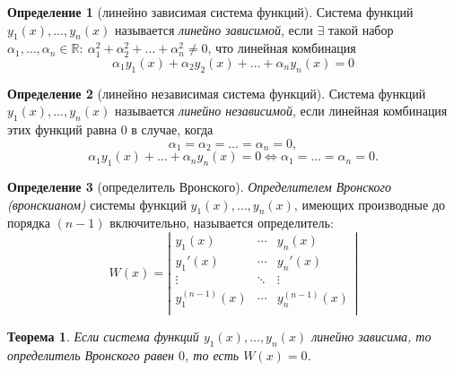 \documentclass[11pt,a4paper,oneside]{report}
\theoremstyle{definition}
\newtheorem{definition}{Определение}[section]
\theoremstyle{plain}
\newtheorem{theorem}{Теорема}[section]
\theoremstyle{remark}
\begin{document}
\begin{definition}[линейно зависимая система функций]
    Система функций $y_1(x), \ldots, y_n(x)$ называется \emph{линейно зависимой}, если $\exists$ такой набор $\alpha_1,\ldots,\alpha_n \in \mathbb{R}: \ \alpha_1^2 + \alpha_2^2 + \ldots + \alpha_n^2 \ne 0$, что линейная комбинация
    \begin{equation*}
        \alpha_1y_1(x) + \alpha_2y_2(x) + \ldots + \alpha_ny_n(x) = 0
    \end{equation*}
\end{definition}

\begin{definition}[линейно независимая система функций]
    Система функций $y_1(x),\ldots,y_n(x)$ называется \emph{линейно независимой}, если линейная комбинация этих функций равна $0$ в случае, когда
    \begin{equation*}
        \alpha_1 = \alpha_2 = \ldots = \alpha_n = 0,
    \end{equation*}
    \begin{equation*}
        \alpha_1y_1(x) + \ldots + \alpha_ny_n(x) = 0 \iff \alpha_1 = \ldots = \alpha_n = 0.
    \end{equation*}
\end{definition}

\begin{definition}[определитель Вронского]
    \emph{Определителем Вронского (вронскианом)} системы функций $y_1(x),\ldots,y_n(x)$, имеющих производные до порядка $(n-1)$ включительно, называется определитель:
    \begin{equation*}
        W(x) = \left|\begin{matrix}
            y_1(x)         & \cdots & y_n(x)         \\
            y_1'(x)        & \cdots & y_n'(x)        \\
            \vdots         & \ddots & \vdots         \\
            y_1^{(n-1)}(x) & \cdots & y_n^{(n-1)}(x) \\
        \end{matrix}\right|
    \end{equation*}
\end{definition}

\begin{theorem}
    Если система функций $y_1(x), \ldots, y_n(x)$ линейно зависима, то определитель Вронского равен $0$, то есть $W(x) = 0$.
\end{theorem}
\end{document}
